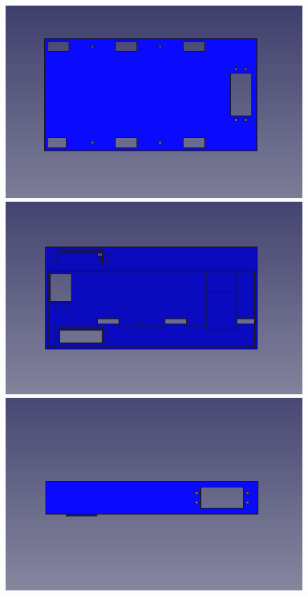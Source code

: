 \begin{figure}[ht!]
	\centering
	\begin{minipage}{0.45\linewidth}
		\centering
		\includegraphics[width=\linewidth]{figs/cap5/basevistasuperiorsin.png}
		\caption*{\centering} %
	\end{minipage}
	\hspace{1cm}
	\begin{minipage}{0.45\linewidth}
		\centering
		\includegraphics[width=\linewidth]{figs/cap5/basevistaladosin.png}
		\caption*{\centering} %
	\end{minipage}
	\hspace{1cm}
	\begin{minipage}{0.45\linewidth}
		\centering
		\includegraphics[width=\linewidth]{figs/cap5/basevistalateralsin.png}

\end{minipage}
\end{figure}
